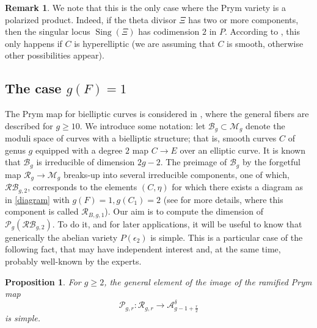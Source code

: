 \documentclass[preprint,12pt]{amsart}
\def\cA{\ensuremath{\mathcal{A}}}
\def\cB{\ensuremath{\mathcal{B}}}
\def\cM{\ensuremath{\mathcal{M}}}
\def\cP{\ensuremath{\mathcal{P}}}
\def\cR{\ensuremath{\mathcal{R}}}
\theoremstyle{plain}
\newtheorem{proposition}[proposition]{Proposition}
\theoremstyle{definition}
\newtheorem{rem}[rem]{Remark}
\begin{document}
\begin{rem}\label{products}
We note that this is the only case where the Prym variety is a polarized product.
Indeed, if the theta divisor $\Xi$ has two or more components, then the singular locus $\operatorname{Sing}(\Xi)$ has codimension $2$ in $P$.
According to \cite[Theorem~4.10]{be}, this only happens if $C$ is hyperelliptic (we are assuming that $C$ is smooth, otherwise other possibilities appear).
\end{rem}


\subsection{The case \texorpdfstring{$g(F)=1$}{g(F)=1}}

The Prym map for bielliptic curves is considered in \cite{N}, 
where the general fibers are described for $g\ge 10$.
We introduce some notation: let $\cB_g\subset \cM_g$ denote the moduli space of curves with a bielliptic structure; 
that is, smooth curves $C$ of genus $g$ equipped with a degree $2$ map $C\rightarrow E$ over an elliptic curve.
It is known that $\cB_g$ is irreducible of dimension $2g-2$.
The preimage of $\cB_g$ by the forgetful map $\cR_g\rightarrow \cM_g$ breaks-up into several irreducible components, one of which, $\mathcal {RB}_{g,2}$, 
corresponds to the elements $(C,\eta)$ for which there exists a diagram as in \eqref{diagram} with $g(F)=1, g(C_1)=2$ 
(see \cite[Section~2]{N} for more details, where this component is called $\cR_{B,g,1}$). Our aim is to compute the dimension of $\cP_g(\mathcal {RB}_{g,2})$. To do it, and for later applications, it will be useful to know that generically the abelian variety $P(\epsilon_2)$ is simple.
This is a particular case of the following fact, that may have independent interest and, at the same time, probably well-known by the experts.
\begin{proposition}\label{Prym_simple} 
For $g\geq 2$, the general element of the image of the ramified Prym map
\[
\cP^{}_{g,r}: \cR^{}_{g,r} \to \cA^{\delta }_{g-1+\frac r2}
\]
is simple.
\end{proposition}
\end{document}
